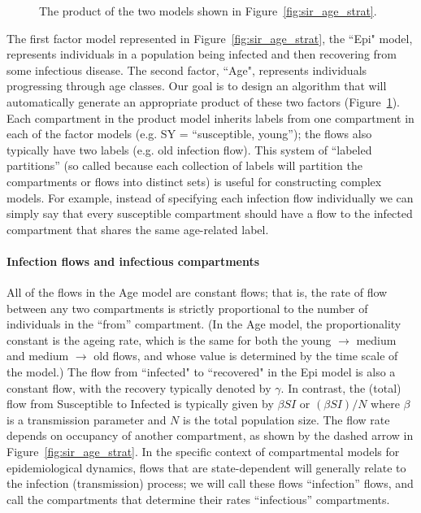 \begin{figure}
    \centering
    
    \caption{The product of the two models shown in Figure~\ref{fig:sir_age_strat}.}
    \label{fig:simple_sir_age}
\end{figure}

The first factor model represented in Figure~\ref{fig:sir_age_strat}, the ``Epi" model, represents individuals in a population being infected and then recovering from some infectious disease. The second factor, ``Age", represents individuals progressing through age classes. Our goal is to design an algorithm that will automatically generate an appropriate product of these two factors (Figure~\ref{fig:simple_sir_age}). Each compartment in the product model inherits labels from one compartment in each of the factor models (e.g. SY = ``susceptible, young''); the flows also typically have two labels (e.g. old infection flow). This system of ``labeled partitions'' (so called because each collection of labels will partition the compartments or flows into distinct sets) is useful for constructing complex models. For example, instead of specifying each infection flow individually we can simply say that every susceptible compartment should have a flow to the infected compartment that shares the same age-related label.

\paragraph{Infection flows and infectious compartments}


All of the flows in the Age model are constant \pc flows; that is, the rate of flow between any two compartments is strictly proportional to the number of individuals in the ``from'' compartment. (In the Age model, the proportionality constant is the ageing rate, which is the same for both the young $\to$ medium and medium $\to$ old flows, and whose value is determined by the time scale of the model.)
The flow from ``infected" to ``recovered" in the Epi model is also a constant \pc flow, with the \pc recovery typically denoted by $\gamma$. In contrast, the (total) flow from Susceptible to Infected is typically given by $\beta SI$ or $(\beta S I)/N$ where $\beta$ is a transmission parameter and $N$ is the total population size. The \pc flow rate depends on occupancy of another compartment, as shown by the dashed arrow in Figure~\ref{fig:sir_age_strat}. In the specific context of compartmental models for epidemiological dynamics, \pc flows that are state-dependent will generally relate to the infection (transmission) process; we will call these flows ``infection'' flows, and call the compartments that determine their rates ``infectious'' compartments.

